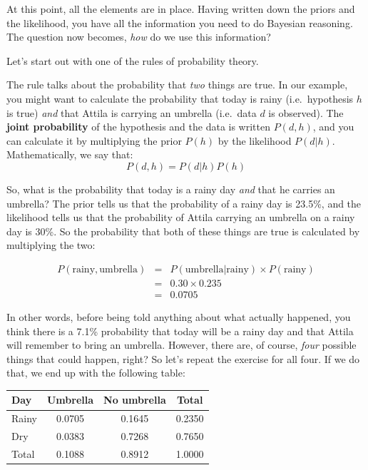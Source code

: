 \documentclass[
  11pt,
  a4paper,
  twoside,symmetric,openright]{book}
\theoremstyle{break}
\theoremstyle{break}
\begin{document}
At this point, all the elements are in place. Having written down the priors and the likelihood, you have all the information you need to do Bayesian reasoning. The question now becomes, \emph{how} do we use this information?

Let's start out with one of the rules of probability theory.

The rule talks about the probability that \emph{two} things are true. In our example, you might want to calculate the probability that today is rainy (i.e.~hypothesis \(h\) is true) \emph{and} that Attila is carrying an umbrella (i.e.~data \(d\) is observed). The \textbf{joint probability} of the hypothesis and the data is written \(P(d,h)\), and you can calculate it by multiplying the prior \(P(h)\) by the likelihood \(P(d|h)\). Mathematically, we say that:
\[
P(d,h) = P(d|h) P(h)
\]

So, what is the probability that today is a rainy day \emph{and} that he carries an umbrella? The prior tells us that the probability of a rainy day is 23.5\%, and the likelihood tells us that the probability of Attila carrying an umbrella on a rainy day is 30\%. So the probability that both of these things are true is calculated by multiplying the two:

\[
\begin{array}{rcl}
P(\mbox{rainy}, \mbox{umbrella}) & = & P(\mbox{umbrella} | \mbox{rainy}) \times P(\mbox{rainy}) \\
& = & 0.30 \times 0.235 \\
& = & 0.0705
\end{array}
\]

In other words, before being told anything about what actually happened, you think there is a 7.1\% probability that today will be a rainy day and that Attila will remember to bring an umbrella. However, there are, of course, \emph{four} possible things that could happen, right? So let's repeat the exercise for all four. If we do that, we end up with the following table:

\begin{longtable}[]{@{}lccc@{}}
\toprule\noalign{}
Day & Umbrella & No umbrella & Total \\
\midrule\noalign{}
\endhead
\bottomrule\noalign{}
\endlastfoot
Rainy & 0.0705 & 0.1645 & 0.2350 \\
Dry & 0.0383 & 0.7268 & 0.7650 \\
Total & 0.1088 & 0.8912 & 1.0000 \\
\end{longtable}
\end{document}
